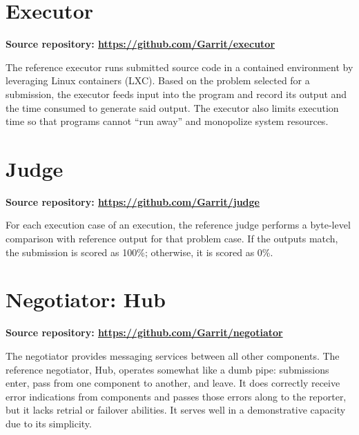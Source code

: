 \documentclass[11pt,letterpaper]{article}
\begin{document}
\section{Executor}
\label{executor}

\textbf{Source repository: \url{https://github.com/Garrit/executor}}

The reference executor runs submitted source code in a contained environment by
leveraging Linux containers (LXC). Based on the problem selected for a
submission, the executor feeds input into the program and record its output and
the time consumed to generate said output. The executor also limits execution
time so that programs cannot ``run away'' and monopolize system resources.

\section{Judge}
\label{judge}

\textbf{Source repository: \url{https://github.com/Garrit/judge}}

For each execution case of an execution, the reference judge performs a
byte-level comparison with reference output for that problem case. If the
outputs match, the submission is scored as 100\%; otherwise, it is scored as
0\%.

\section{Negotiator: Hub}
\label{negotiator}

\textbf{Source repository: \url{https://github.com/Garrit/negotiator}}

The negotiator provides messaging services between all other components. The
reference negotiator, Hub, operates somewhat like a dumb pipe: submissions
enter, pass from one component to another, and leave. It does correctly receive
error indications from components and passes those errors along to the
reporter, but it lacks retrial or failover abilities. It serves well in a
demonstrative capacity due to its simplicity.
\end{document}
